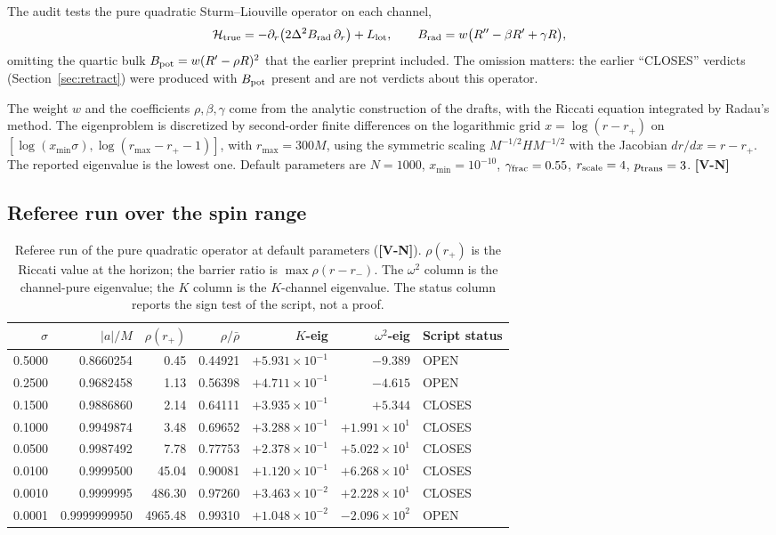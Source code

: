 \documentclass[11pt, a4paper]{article}
\newcommand{\VN}{\textcolor{vn}{\textbf{[V-N]}}}
\theoremstyle{remark}
\theoremstyle{definition}
\begin{document}
The audit tests the pure quadratic Sturm--Liouville operator on each channel,
\[
\mathcal{H}_{\rm true} = -\partial_r\bigl(2\Delta^2 B_{\rm rad}\,\partial_r\bigr) + L_{\rm lot}, \qquad B_{\rm rad} = w\bigl(R'' - \beta R' + \gamma R\bigr),
\]
omitting the quartic bulk $B_{\rm pot} = w(R'-\rho R)^2$ that the earlier preprint included. The omission matters: the earlier ``CLOSES'' verdicts (Section~\ref{sec:retract}) were produced with $B_{\rm pot}$ present and are not verdicts about this operator.

The weight $w$ and the coefficients $\rho,\beta,\gamma$ come from the analytic construction of the drafts, with the Riccati equation integrated by Radau's method. The eigenproblem is discretized by second-order finite differences on the logarithmic grid $x = \log(r - r_+)$ on $[\log(x_{\min}\sigma), \log(r_{\max}-r_+-1)]$, with $r_{\max} = 300M$, using the symmetric scaling $M^{-1/2}HM^{-1/2}$ with the Jacobian $dr/dx = r - r_+$. The reported eigenvalue is the lowest one. Default parameters are $N=1000$, $x_{\min} = 10^{-10}$, $\gamma_{\rm frac} = 0.55$, $r_{\rm scale} = 4$, $p_{\rm trans} = 3$. \VN

\subsection{Referee run over the spin range}

\begin{table}[H]
\centering
\caption{Referee run of the pure quadratic operator at default parameters (\VN). $\rho(r_+)$ is the Riccati value at the horizon; the barrier ratio is $\max \rho(r-r_-)$. The $\omega^2$ column is the channel-pure eigenvalue; the $K$ column is the $K$-channel eigenvalue. The status column reports the sign test of the script, not a proof.}
\label{tab:referee}
\footnotesize\begin{tabular}{@{}rrrrrrl@{}}
\toprule
$\sigma$ & $|a|/M$ & $\rho(r_+)$ & $\rho/\bar\rho$ & $K$-eig & $\omega^2$-eig & Script status \\
\midrule
0.5000 & 0.8660254 & 0.45 & 0.44921 & $+5.931\times10^{-1}$ & $-9.389$ & OPEN \\
0.2500 & 0.9682458 & 1.13 & 0.56398 & $+4.711\times10^{-1}$ & $-4.615$ & OPEN \\
0.1500 & 0.9886860 & 2.14 & 0.64111 & $+3.935\times10^{-1}$ & $+5.344$ & CLOSES \\
0.1000 & 0.9949874 & 3.48 & 0.69652 & $+3.288\times10^{-1}$ & $+1.991\times10^{1}$ & CLOSES \\
0.0500 & 0.9987492 & 7.78 & 0.77753 & $+2.378\times10^{-1}$ & $+5.022\times10^{1}$ & CLOSES \\
0.0100 & 0.9999500 & 45.04 & 0.90081 & $+1.120\times10^{-1}$ & $+6.268\times10^{1}$ & CLOSES \\
0.0010 & 0.9999995 & 486.30 & 0.97260 & $+3.463\times10^{-2}$ & $+2.228\times10^{1}$ & CLOSES \\
0.0001 & 0.9999999950 & 4965.48 & 0.99310 & $+1.048\times10^{-2}$ & $-2.096\times10^{2}$ & OPEN \\
\bottomrule
\end{tabular}
\end{table}
\end{document}
